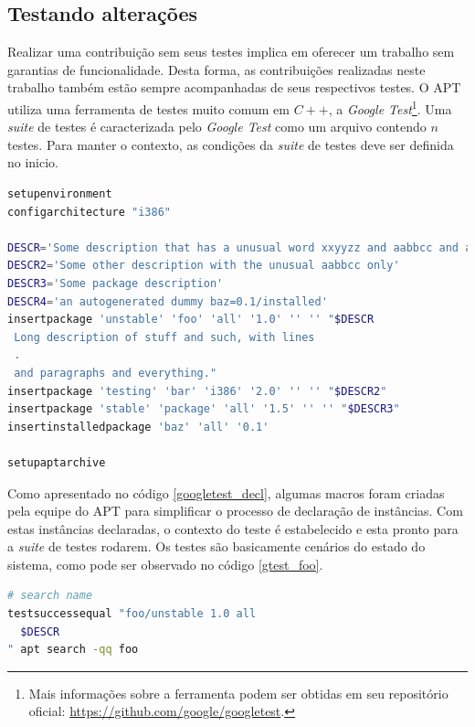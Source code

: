
\subsection*{Testando alterações} %

Realizar uma contribuição sem seus testes implica em oferecer um trabalho sem garantias de funcionalidade. Desta forma, as contribuições realizadas neste trabalho também estão sempre acompanhadas de seus respectivos testes. O APT utiliza uma ferramenta de testes muito comum em $C++$, a \textit{Google Test}\footnote{Mais informações sobre a ferramenta podem ser obtidas em seu repositório oficial: \url{https://github.com/google/googletest}.}. Uma \textit{suite} de testes é caracterizada pelo \textit{Google Test} como um arquivo contendo $n$ testes. Para manter o contexto, as condições da \textit{suite} de testes deve ser definida no inicio.

\begin{lstlisting}[language=Bash,label=googletest_decl,caption={Declarações de instâncias para o teste}]
setupenvironment
configarchitecture "i386"

DESCR='Some description that has a unusual word xxyyzz and aabbcc and a UPPERCASE'
DESCR2='Some other description with the unusual aabbcc only'
DESCR3='Some package description'
DESCR4='an autogenerated dummy baz=0.1/installed'
insertpackage 'unstable' 'foo' 'all' '1.0' '' '' "$DESCR
 Long description of stuff and such, with lines
 .
 and paragraphs and everything."
insertpackage 'testing' 'bar' 'i386' '2.0' '' '' "$DESCR2"
insertpackage 'stable' 'package' 'all' '1.5' '' '' "$DESCR3"
insertinstalledpackage 'baz' 'all' '0.1'

setupaptarchive
\end{lstlisting}

Como apresentado no código \ref{googletest_decl}, algumas macros foram criadas pela equipe do APT para simplificar o processo de declaração de instâncias. Com estas instâncias declaradas, o contexto do teste é estabelecido e esta pronto para a \textit{suite} de testes rodarem. Os testes são basicamente cenários do estado do sistema, como pode ser observado no código \ref{gtest_foo}.

\begin{lstlisting}[language=Bash,label=gtest_foo,caption={Teste por busca pelo pacote \textit{foo}}]
# search name
testsuccessequal "foo/unstable 1.0 all
  $DESCR
" apt search -qq foo
\end{lstlisting}

